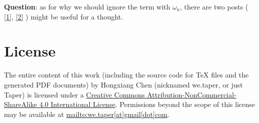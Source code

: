 \documentclass{article}
\begin{document}
\textbf{Question}: as for why we should ignore the term with $\omega_a$, there
are two posts (
    \href{http://physics.stackexchange.com/questions/122965/derivation-of-the-noether-current}{[1]},
    \href{http://physics.stackexchange.com/questions/99853/on-a-trick-to-derive-the-noether-current}{[2]} )
might be useful for a thought.

{}


\printnomenclature
\section{License}
The entire content of this work (including the source code
for TeX files and the generated PDF documents) by 
Hongxiang Chen (nicknamed we.taper, or just Taper) is
licensed under a 
\href{http://creativecommons.org/licenses/by-nc-sa/4.0/}{Creative 
Commons Attribution-NonCommercial-ShareAlike 4.0 International 
License}. Permissions beyond the scope of this 
license may be available at \url{mailto:we.taper[at]gmail[dot]com}.
\end{document}
